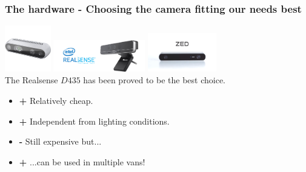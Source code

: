 \documentclass{beamer}
\begin{document}
\begin{frame}
\frametitle{The hardware - Choosing the camera fitting our needs best} %


\includegraphics[width = 2cm]{Figures/Realsense1}
\includegraphics[width = 4cm]{Figures/intel2} \hspace{1cm}
\includegraphics[width = 3cm]{Figures/ZED} \hspace{2cm}
\\ %
The Realsense $D435$ has been proved to be the best choice.
\begin{itemize}
	\item \textbf{+ } Relatively cheap.
	
	\item \textbf{+ } Independent from lighting conditions. 
		
	\item \textbf{-} Still expensive but...
	\item \textbf{+ } ...can be used in multiple vans!	
\end{itemize}




\end{frame}
\end{document}
